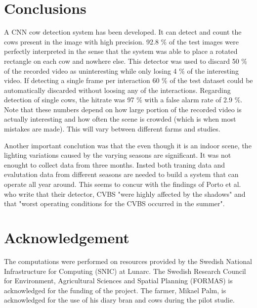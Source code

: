 \documentclass{cta-author}
\begin{document}
\section{Conclusions}
A CNN cow detection system has been developed. It can detect and count the cows present in the image with 
high precision. 92.8 \% of the test images were perfectly interpreted in the sense that the system was able 
to place a rotated rectangle on each cow and nowhere else. This detector was used to discard 50 \% of the 
recorded video as uninteresting while only losing 4 \% of the interesting video. If detecting a single frame 
per interaction 60 \% of the test dataset could be automatically discarded without loosing any of the 
interactions. Regarding detection of single cows, the hitrate was 97 \% with a false alarm rate of 2.9 \%. 
Note that these numbers depend on how large portion of the recorded video is actually interesting and how 
often the scene is crowded (which is when most mistakes are made). This will vary between different farms and 
studies.

Another important conclution was that the even though it is an indoor scene, the lighting variations caused 
by the varying seasons are significant. It was not enought to collect data from three months. Insted both 
traning data and evalutation data from different seasons are needed to build a system that can operate all 
year around. This seems to concur with the findings of Porto et al. \cite{porto2015automatic} who write that 
their detector, CVBS 
"were highly affected by the shadows" and that "worst operating
conditions for the CVBS occurred in the summer".


\section{Acknowledgement}
The computations were performed on resources provided by the Swedish National Infrastructure for Computing 
(SNIC) at Lunarc. The Swedish Research Council for Environment, Agricultural Sciences and 
Spatial Planning (FORMAS) is acknowledged 
for the funding of the project. The farmer, Mikael Palm, is acknowledged for the use of his diary bran and 
cows during the pilot studie.




{\parindent0pt
\parskip8pt

}
\end{document}
